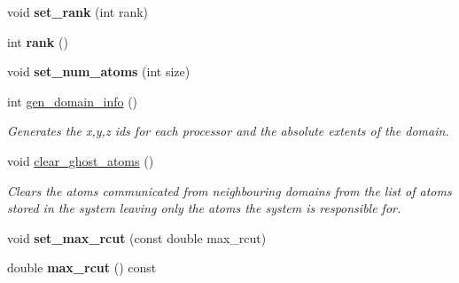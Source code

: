 \begin{DoxyCompactItemize}
\item 
\hypertarget{classsim__system_1_1System_a56b0bf52d8741dfeb540d2a1dc56d57c}{void {\bfseries set\-\_\-rank} (int rank)}\label{classsim__system_1_1System_a56b0bf52d8741dfeb540d2a1dc56d57c}

\item 
\hypertarget{classsim__system_1_1System_af5c9d4d73383f8b89622d2e7936ac689}{int {\bfseries rank} ()}\label{classsim__system_1_1System_af5c9d4d73383f8b89622d2e7936ac689}

\item 
\hypertarget{classsim__system_1_1System_a2f9670ba6d66340eba573fab862d0391}{void {\bfseries set\-\_\-num\-\_\-atoms} (int size)}\label{classsim__system_1_1System_a2f9670ba6d66340eba573fab862d0391}

\item 
\hypertarget{classsim__system_1_1System_a162b6a964dcd1c0c41b695540d938c6c}{int \hyperlink{classsim__system_1_1System_a162b6a964dcd1c0c41b695540d938c6c}{gen\-\_\-domain\-\_\-info} ()}\label{classsim__system_1_1System_a162b6a964dcd1c0c41b695540d938c6c}

\begin{DoxyCompactList}\small\item\em Generates the x,y,z ids for each processor and the absolute extents of the domain. \end{DoxyCompactList}\item 
\hypertarget{classsim__system_1_1System_a606c987ac99162a899968731eb61de44}{void \hyperlink{classsim__system_1_1System_a606c987ac99162a899968731eb61de44}{clear\-\_\-ghost\-\_\-atoms} ()}\label{classsim__system_1_1System_a606c987ac99162a899968731eb61de44}

\begin{DoxyCompactList}\small\item\em Clears the atoms communicated from neighbouring domains from the list of atoms stored in the system leaving only the atoms the system is responsible for. \end{DoxyCompactList}\item 
\hypertarget{classsim__system_1_1System_a3f7d39775b15387aea20da7afd4a76fb}{void {\bfseries set\-\_\-max\-\_\-rcut} (const double max\-\_\-rcut)}\label{classsim__system_1_1System_a3f7d39775b15387aea20da7afd4a76fb}

\item 
\hypertarget{classsim__system_1_1System_ab37d629a24203d37be0aa7eedc53be82}{double {\bfseries max\-\_\-rcut} () const }\label{classsim__system_1_1System_ab37d629a24203d37be0aa7eedc53be82}


\end{DoxyCompactItemize}
